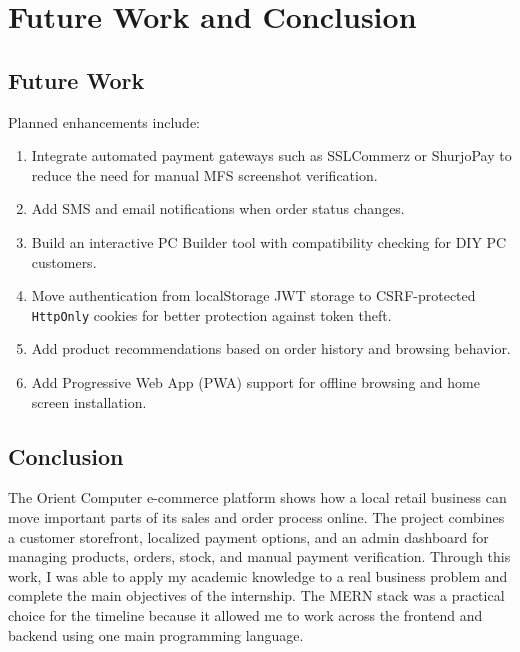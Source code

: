 \documentclass[12pt,a4paper,oneside]{report}
\begin{document}
\chapter{Future Work and Conclusion}

\section{Future Work}
Planned enhancements include:
\begin{enumerate}
    \item Integrate automated payment gateways such as SSLCommerz or ShurjoPay to reduce the need for manual MFS screenshot verification.
    \item Add SMS and email notifications when order status changes.
    \item Build an interactive PC Builder tool with compatibility checking for DIY PC customers.
    \item Move authentication from localStorage JWT storage to CSRF-protected \texttt{HttpOnly} cookies for better protection against token theft.
    \item Add product recommendations based on order history and browsing behavior.
    \item Add Progressive Web App (PWA) support for offline browsing and home screen installation.
\end{enumerate}

\section{Conclusion}
The Orient Computer e-commerce platform shows how a local retail business can move important parts of its sales and order process online. The project combines a customer storefront, localized payment options, and an admin dashboard for managing products, orders, stock, and manual payment verification. Through this work, I was able to apply my academic knowledge to a real business problem and complete the main objectives of the internship. The MERN stack was a practical choice for the timeline because it allowed me to work across the frontend and backend using one main programming language.
\end{document}
